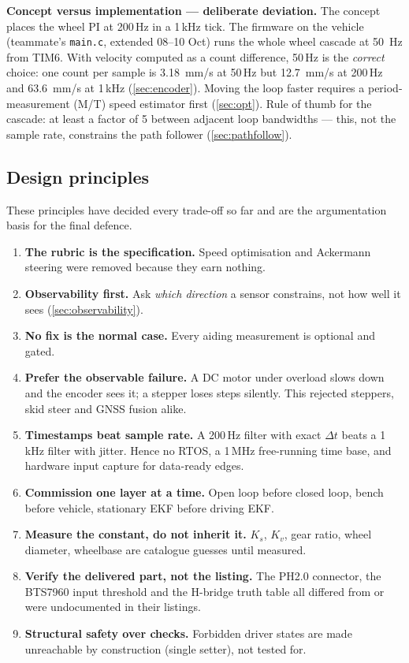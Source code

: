 \documentclass[11pt,a4paper]{article}
\newcommand{\code}[1]{\texttt{\small #1}}
\begin{document}
\begin{warnbox}
\textbf{Concept versus implementation --- deliberate deviation.} The concept
places the wheel PI at 200\,Hz in a 1\,kHz tick. The firmware on the vehicle
(teammate's \code{main.c}, extended 08--10 Oct) runs the whole wheel cascade at
\qty{50}{Hz} from TIM6. With velocity computed as a count difference, 50\,Hz is
the \emph{correct} choice: one count per sample is \qty{3.18}{mm/s} at 50\,Hz but
\qty{12.7}{mm/s} at 200\,Hz and \qty{63.6}{mm/s} at 1\,kHz (\cref{sec:encoder}).
Moving the loop faster requires a period-measurement (M/T) speed estimator first
(\cref{sec:opt}). Rule of thumb for the cascade: at least a factor of 5 between
adjacent loop bandwidths --- this, not the sample rate, constrains the path
follower (\cref{sec:pathfollow}).
\end{warnbox}

\subsection{Design principles}

These principles have decided every trade-off so far and are the
argumentation basis for the final defence.

\begin{enumerate}[leftmargin=6mm,label=P\arabic*]
\item \textbf{The rubric is the specification.} Speed optimisation and Ackermann steering were removed because they earn nothing.
\item \textbf{Observability first.} Ask \emph{which direction} a sensor constrains, not how well it sees (\cref{sec:observability}).
\item \textbf{No fix is the normal case.} Every aiding measurement is optional and gated.
\item \textbf{Prefer the observable failure.} A DC motor under overload slows down and the encoder sees it; a stepper loses steps silently. This rejected steppers, skid steer and GNSS fusion alike.
\item \textbf{Timestamps beat sample rate.} A 200\,Hz filter with exact $\Delta t$ beats a 1\,kHz filter with jitter. Hence no RTOS, a 1\,MHz free-running time base, and hardware input capture for data-ready edges.
\item \textbf{Commission one layer at a time.} Open loop before closed loop, bench before vehicle, stationary EKF before driving EKF.
\item \textbf{Measure the constant, do not inherit it.} $K_s$, $K_v$, gear ratio, wheel diameter, wheelbase are catalogue guesses until measured.
\item \textbf{Verify the delivered part, not the listing.} The PH2.0 connector, the BTS7960 input threshold and the H-bridge truth table all differed from or were undocumented in their listings.
\item \textbf{Structural safety over checks.} Forbidden driver states are made unreachable by construction (single setter), not tested for.
\end{enumerate}
\end{document}
